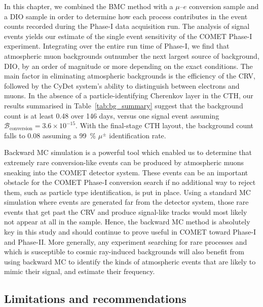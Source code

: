In this chapter, we combined the BMC method with a $\mu$--$e$ conversion sample
and a DIO sample in order to determine how each process contributes in the event
counts recorded during the Phase\nobreakdash-I data acquisition run. The
analysis of signal events yields our estimate of the single event sensitivity of
the COMET Phase\nobreakdash-I experiment. Integrating over the entire run time
of Phase\nobreakdash-I, we find that atmospheric muon backgrounds outnumber the
next largest source of background, DIO, by an order of magnitude or more
depending on the exact conditions. The main factor in eliminating atmospheric
backgrounds is the efficiency of the CRV, followed by the CyDet system's ability
to distinguish between electrons and muons. In the absence of a
particle-identifying Cherenkov layer in the CTH, our results summarised in
Table~\ref{tab:bg_summary} suggest that the background count is at least 0.48
over 146 days, versus one signal event assuming $\mathcal{B}_\mathrm{conversion}
= 3.6 \times 10^{-15}$. With the final-stage CTH layout, the background count
falls to 0.08 assuming a \SI{99}{\percent} $\mu^\pm$ identification rate.


Backward MC simulation is a powerful tool which enabled us to determine that
extremely rare conversion-like events can be produced by atmospheric muons
sneaking into the COMET detector system. These events can be an important
obstacle for the COMET Phase\nobreakdash-I conversion search if no additional way to
reject them, such as particle type identification, is put in place. Using a
standard MC simulation where events are generated far from the detector system,
those rare events that get past the CRV and produce signal-like tracks would
most likely not appear at all in the sample. Hence, the backward MC method is
absolutely key in this study and should continue to prove useful in COMET toward
Phase\nobreakdash-I and Phase\nobreakdash-II. More generally, any experiment searching for rare
processes and which is susceptible to cosmic ray-induced backgrounds will also
benefit from using backward MC to identify the kinds of atmospheric events that
are likely to mimic their signal, and estimate their frequency.

\subsection{Limitations and recommendations}


